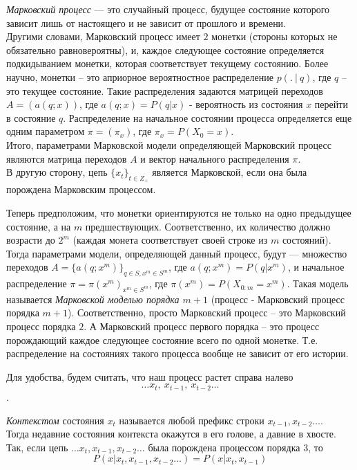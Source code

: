 \documentclass{matmex-diploma-custom}
\begin{document}
\textit{Марковский процесс} --- это случайный процесс, будущее состояние которого зависит лишь от настоящего и не зависит от прошлого и времени.
\\
Другими словами, Марковский процесс имеет $ 2 $ монетки (стороны которых не обязательно равновероятны), и, каждое следующее состояние определяется подкидыванием монетки, которая соответствует текущему состоянию.
Более научно, монетки -- это априорное вероятностное распределение $p(.~|~q)$, где $ q $ -- это текущее состояние.
Такие распределения задаются матрицей переходов $A = (a(q;x))$, где $a(q; x) = P(q|x)$ - вероятность из состояния $ x $ перейти в состояние $ q $.
Распределение на начальное состоянии процесса определяется еще одним параметром $ \pi = (\pi_{x})$, где $ \pi_{x}=P(X_{0}=x)$.
\\
Итого, параметрами Марковской модели определяющей Марковский процесс являются
матрица переходов $ A $ и вектор начального распределения $\pi$.
\\
В другую сторону,
цепь $ \{x_{t}\}_{t \in Z_{+}} $ является Марковской, если она была порождена Марковским процессом.

Теперь предположим, что монетки ориентируются не только на одно предыдущее состояние, а на $ m $ предшествующих. 
Соответственно, их количество должно возрасти до $2^{m}$ (каждая монета соответствует своей строке из $ m $ состояний).
Тогда параметрами модели, определяющей данный процесс, будут --- множество переходов $ A = \{a(q; x^{m})\}_{q \in S, x^{m} \in S^{m}}$, где $a(q; x^{m}) = P(q|x^{m})$, и начальное распределение $ \pi = \pi(x^m)_{x^m \in S^m}$, где $\pi(x^m) = P(X_{0:m}=x^m)$.
Такая модель называется \textit{Марковской моделью порядка $ m+1 $} (процесс - Марковский процесс порядка $ m+1 $).
Соответственно, просто Марковский процесс -- это Марковский процесс порядка $ 2 $.
А Марковский процесс первого порядка -- это процесс порождающий каждое следующее состояние всего по одной монетке. Т.е. распределение на состояниях такого процесса вообще не зависит от его истории. 

Для удобства, будем считать, что наш процесс растет справа налево  
$$\ldots x_{t},~ x_{t-1},~ x_{t-2} \ldots$$.

\textit{Контекстом} состояния $ x_{t} $  называется любой префикс строки  $x_{t-1}, x_{t-2} \ldots$. 
\\
Тогда недавние состояния контекста окажутся в его голове, а давние в хвосте.
\\
Так,  если цепь $\ldots x_{t}, x_{t-1}, x_{t-2} \ldots$ была порождена процессом порядка $3$,
то $$P(x|x_{t},x_{t-1},x_{t-2}\ldots) = P(x|x_{t},x_{t-1})$$
\end{document}
